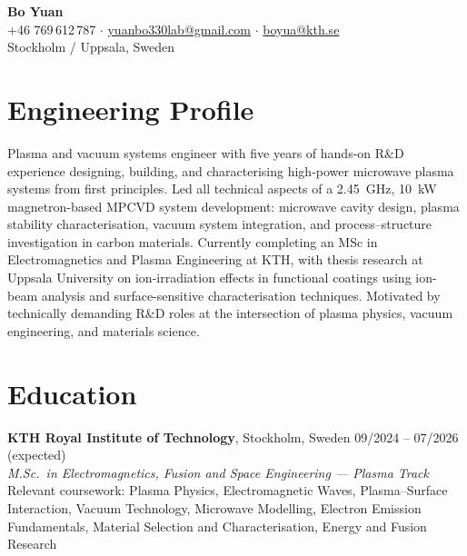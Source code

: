 \documentclass[a4paper,11pt]{article}
\begin{document}
\begin{center}
    {\LARGE \textbf{Bo Yuan}} \\
    \vspace{0.15cm}
    +46 769\,612\,787 \enspace $\cdot$ \enspace
    \href{mailto:yuanbo330lab@gmail.com}{yuanbo330lab@gmail.com} \enspace $\cdot$ \enspace
    \href{mailto:boyua@kth.se}{boyua@kth.se} \\
    Stockholm / Uppsala, Sweden
\end{center}

\vspace{0.3cm}

\section*{Engineering Profile}

Plasma and vacuum systems engineer with five years of hands-on R\&D experience
designing, building, and characterising high-power microwave plasma systems
from first principles. Led all technical aspects of a 2.45~GHz, 10~kW
magnetron-based MPCVD system development: microwave cavity design, plasma
stability characterisation, vacuum system integration, and process--structure
investigation in carbon materials. Currently completing an MSc in Electromagnetics
and Plasma Engineering at KTH, with thesis research at Uppsala University on
ion-irradiation effects in functional coatings using ion-beam analysis and
surface-sensitive characterisation techniques. Motivated by technically demanding
R\&D roles at the intersection of plasma physics, vacuum engineering, and
materials science.

\section*{Education}

\noindent\textbf{KTH Royal Institute of Technology}, Stockholm, Sweden
\hfill 09/2024 -- 07/2026 (expected) \\
\textit{M.Sc.\ in Electromagnetics, Fusion and Space Engineering --- Plasma Track} \\
Relevant coursework: Plasma Physics, Electromagnetic Waves, Plasma--Surface
Interaction, Vacuum Technology, Microwave Modelling, Electron Emission
Fundamentals, Material Selection and Characterisation, Energy and Fusion Research
\end{document}
